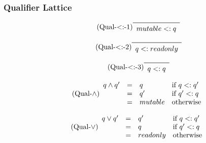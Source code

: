 \subsubsection{Qualifier Lattice}

\begin{equation*}\tag{\mbox{Qual-$<:$-1}}\label{equ-}
\begin{array}{c}
\midrule
mutable <: q \\
\end{array}
\end{equation*}

\vspace{0.4cm}

\begin{equation*}\tag{\mbox{Qual-$<:$-2}}\label{equ-}
\begin{array}{c}
\midrule
q <: readonly \\
\end{array}
\end{equation*}

\vspace{0.4cm}

\begin{equation*}\tag{\mbox{Qual-$<:$-3}}\label{equ-}
\begin{array}{c}
\midrule
q <: q \\
\end{array}
\end{equation*}

\vspace{0.4cm}

\begin{equation*}\tag{\mbox{Qual-$\land$}}\label{equ-qual-meet}
\begin{array}{llll}
q \land q'  &=& q & \text{if $q <: q'$} \\
            &=& q' & \text{if $q' <: q$} \\
            &=& mutable & \text{otherwise} \\
\end{array}
\end{equation*}

\vspace{0.4cm}

\begin{equation*}\tag{\mbox{Qual-$\lor$}}\label{equ-qual-join}
\begin{array}{llll}
q \lor q'  &=& q' & \text{if $q <: q'$} \\
            &=& q & \text{if $q' <: q$} \\
            &=& readonly & \text{otherwise} \\
\end{array}
\end{equation*}

